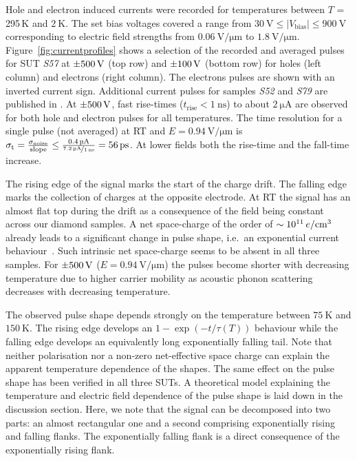 Hole and electron induced currents were recorded for temperatures between $T$ = 295\,K and  $\SI{2}{\kelvin}$. 
The set bias voltages covered a range from $ \SI{30}{\volt} \leq |V_{\textrm{bias}}| \leq \SI{900}{\volt}$ corresponding to electric field strengths from $\SI{0.06}{\volt/\um}$ to $\SI{1.8}{\volt/\um}$. 
Figure~\ref{fig:currentprofiles} shows a selection of the recorded and averaged pulses for SUT \textit{S57} at $\SI{\pm 500}{\volt}$ (top row) and $\SI{\pm 100}{\volt}$ (bottom row) for holes (left column)
 and electrons (right column). 
The electrons pulses are shown with an inverted current sign. 
Additional current pulses for samples \textit{S52} and \textit{S79} are published in \cite{JansenThesis}. 
At $\SI{\pm 500}{\volt}$, fast rise-times ($t_{\textrm{rise}} < \SI{1}{\nano\second}$) to about $\SI{2}{\micro\ampere}$  are observed for both hole and electron pulses for all temperatures. 
The time resolution for a single pulse (not averaged) at RT and $E = \SI{0.94}{\volt/\micro\meter}$ is $\sigma_{\textrm{t}} = \frac{\sigma_{\textrm{noise}}}{\textrm{slope}}
\leq \frac{\SI{0.4}{\micro\ampere}}{\nicefrac{\SI{7.2}{\micro\ampere}}{\SI{1}{\nano\second}}} = \SI{56}{\pico\second}$. 
At lower fields both the rise-time and the fall-time increase.

The rising edge of the signal marks the start of the charge drift. 
The falling edge marks the collection of charges at the opposite electrode. 
At RT the signal has an almost flat top during the drift as a consequence of the field being constant across our diamond samples. 
A net space-charge of the order of $\sim \SI{e11}{\ensuremath{\mathnormal{e}}/\centi\meter^3}$ already leads to a significant change in pulse shape,
 i.e.~an exponential current behaviour~\cite{pernegger:073704}. 
Such intrinsic net space-charge seems to be absent in all three samples. 
For $\SI{\pm500}{\volt}$ ($E = \SI{0.94}{\volt/\micro\meter}$) the pulses become shorter with decreasing temperature
 due to higher carrier mobility as acoustic phonon scattering decreases with decreasing temperature.

The observed pulse shape depends strongly on the temperature between $\SI{75}{\kelvin}$ and $\SI{150}{\kelvin}$. 
The rising edge develops an $1-\exp \left(-t/\tau(T)\right)$ behaviour while the falling edge develops an equivalently long exponentially falling tail. 
Note that neither polarisation nor a non-zero net-effective space charge can explain the apparent temperature dependence of the shapes. 
The same effect on the pulse shape has been verified in all three SUTs.
A theoretical model explaining the temperature and electric field dependence of the pulse shape is laid down in the discussion section.
Here, we note that the signal can be decomposed into two parts: an almost rectangular one and a second comprising exponentially rising and falling flanks. 
The exponentially falling flank is a direct consequence of the exponentially rising flank. 

